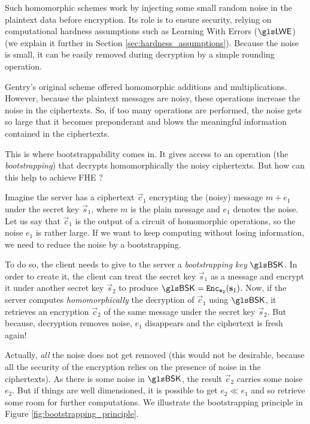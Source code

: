 Such homomorphic schemes work by injecting some small random noise in the plaintext data before encryption. Its role is to ensure security, relying on computational hardness assumptions such as Learning With Errors ($\LWE$) (we explain it further in Section \ref{sec:hardness_assumptions}). Because the noise is small, it can be easily removed during decryption by a simple rounding operation. 

Gentry's original scheme offered homomorphic additions and multiplications. However, because the plaintext messages are noisy, these operations increase the noise in the ciphertexts. So, if too many operations are performed, the noise gets so large that it becomes preponderant and blows the meaningful information contained in the ciphertexts.

This is where bootstrappability comes in. It gives access to an operation (the \textit{bootstrapping}) that decrypts homomorphically the noisy ciphertexts. But how can this help to achieve \gls{FHE} ?

Imagine the server has a ciphertext $\vec c_1$ encrypting the (noisy) message $m +e_1$ under the secret key $\vec s_1$, where $m$ is the plain message and $e_1$ denotes the noise. Let us say that $\vec c_1$ is the output of a circuit of homomorphic operations, so the noise $e_1$ is rather large. If we want to keep computing without losing information, we need to reduce the noise by a bootstrapping. 

To do so, the client needs to give to the server a \textit{bootstrapping key} $\BSK$. In order to create it, the client can treat the secret key $\vec s_1$ as a message and encrypt it under another secret key $\vec s_2$ to produce $\BSK = \texttt{Enc}_{\vec s_2}(\vec s_1)$. Now, if the server computes \textit{homomorphically} the decryption of $\vec c_1$ using $\BSK$, it retrieves an encryption $\vec c_2$ of the same message under the secret key $\vec s_2$. But because, decryption removes noise, $e_1$ disappears and the ciphertext is fresh again!

Actually, \textit{all} the noise does not get removed (this would not be desirable, because all the security of the encryption relies on the presence of noise in the ciphertexts). As there is some noise in $\BSK$, the result $\vec c_2$ carries some noise $e_2$. But if things are well dimensioned, it is possible to get $e_2 \ll e_1$ and so retrieve some room for further computations. We illustrate the bootstrapping principle in Figure \ref{fig:bootstrapping_principle}.


